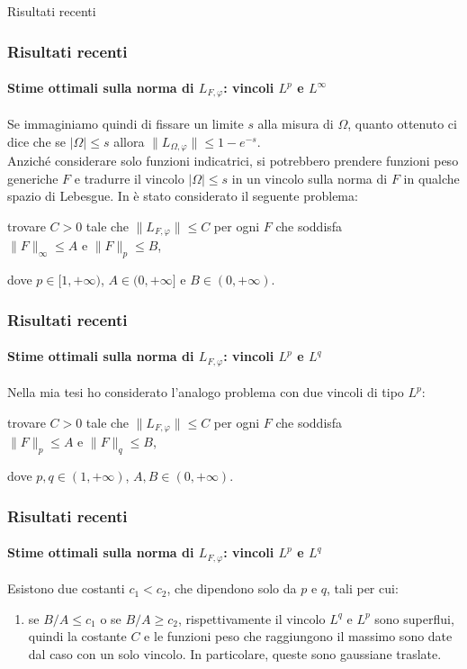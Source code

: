 \documentclass[aspectratio=141]{beamer}
\begin{document}
\begin{section}{Risultati recenti}
	\begin{frame}
		\frametitle{Risultati recenti}
		\framesubtitle{Stime ottimali sulla norma di $L_{F,\varphi}$: vincoli $L^p$ e $L^{\infty}$}
		Se immaginiamo quindi di fissare un limite $s$ alla misura di $\Omega$, quanto ottenuto ci dice che se $|\Omega| \leq s$ allora $\|L_{\Omega, \varphi}\| \leq 1 - e^{-s}$.\\
		\pause
		Anziché considerare solo funzioni indicatrici, si potrebbero prendere funzioni peso generiche $F$ e tradurre il vincolo $|\Omega| \leq s$ in un vincolo sulla norma di $F$ in qualche spazio di Lebesgue.
		\pause
		In \cite{nicolatilli_norm} è stato considerato il seguente problema:
		\begin{center}
			trovare $C>0$ tale che $\|L_{F,\varphi}\| \leq C$ per ogni $F$ che soddisfa\\
			$\|F\|_{\infty} \leq A$ e $\|F\|_{p} \leq B$,			
		\end{center}
		dove $p \in [1,+\infty)$, $A \in (0, +\infty]$ e $B \in (0, +\infty)$.
	\end{frame}

	\begin{frame}
		\frametitle{Risultati recenti}
		\framesubtitle{Stime ottimali sulla norma di $L_{F,\varphi}$: vincoli $L^p$ e $L^q$}
		Nella mia tesi ho considerato l'analogo problema con due vincoli di tipo $L^p$:
		\begin{center}
			trovare $C>0$ tale che $\|L_{F,\varphi}\| \leq C$ per ogni $F$ che soddisfa\\
			$\|F\|_{p} \leq A$ e $\|F\|_{q} \leq B$,			
		\end{center}
		dove $p, q \in (1,+\infty)$, $A,B \in (0, +\infty)$.
	\end{frame}

	\begin{frame}
		\frametitle{Risultati recenti}
		\framesubtitle{Stime ottimali sulla norma di $L_{F,\varphi}$: vincoli $L^p$ e $L^q$}
		\begin{myblock}[Teorema]
			Esistono due costanti $c_1 < c_2$, che dipendono solo da $p$ e $q$, tali per cui:
			\begin{enumerate}
				\item<1> se $B/A \leq c_1$ o se $B/A \geq c_2$, rispettivamente il vincolo $L^q$ e $L^p$ sono superflui, quindi la costante $C$ e le funzioni peso che raggiungono il massimo sono date dal caso con un solo vincolo. In particolare, queste sono gaussiane traslate.
			\end{enumerate}
		\end{myblock}
	\end{frame}
	

\end{section}
\end{document}
